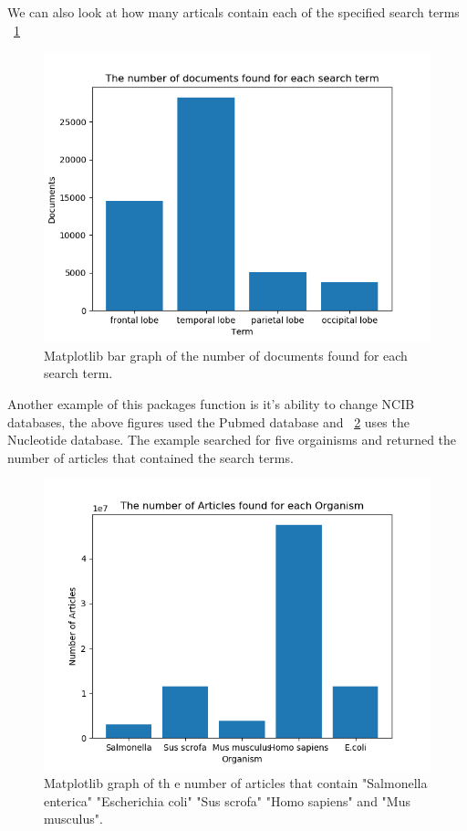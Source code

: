 \documentclass{article}
\begin{document}
We can also look at how many articals contain each of the specified search terms ~\ref{fig:2}
%
\begin{figure}
  \centering
  \includegraphics[width=0.9/textwidth]{document.png}
  \caption{Matplotlib bar graph of the number of documents found for each search term.}
  \label{fig:2}
\end{figure}
%
Another example of this packages function is it's ability to change NCIB databases, the above figures used the Pubmed database and ~\ref{fig:3} uses the Nucleotide database. The example searched for five orgainisms and returned the number of articles that contained the search terms.
%
\begin{figure}
  \centering
  \includegraphics[width=0.9/textwidth]{organism.png}
  \caption{Matplotlib graph of th e number of articles that contain "Salmonella enterica" "Escherichia coli" "Sus scrofa" "Homo sapiens" and "Mus musculus".}
  \label{fig:3}
\end{figure}
%
\end{document}
